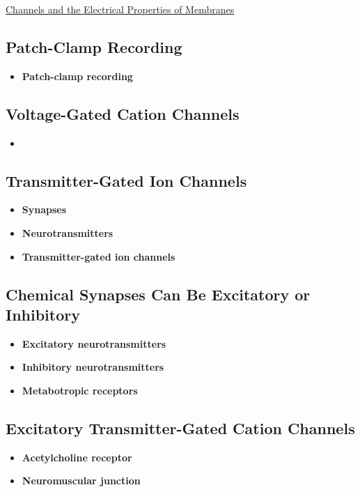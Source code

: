 \documentclass[12pt,letterpaper]{article}
\begin{document}
\begin{secbox}{\hyperlink{11}{Channels and the Electrical Properties of Membranes}}
{    \hypertarget{11.3.10}{\subsection*{Patch-Clamp Recording}}
    \begin{itemize}
        \item \textbf{Patch-clamp recording}
    \end{itemize}

    \hypertarget{11.3.11}{\subsection*{Voltage-Gated Cation Channels}}
    \begin{itemize}
        \item
    \end{itemize}
    
    \hypertarget{11.3.12}{\subsection*{Transmitter-Gated Ion Channels}}
    \begin{itemize}
        \item \textbf{Synapses}
        \item \textbf{Neurotransmitters}
        \item \textbf{Transmitter-gated ion channels}
    \end{itemize}
    
    \hypertarget{11.3.13}{\subsection*{Chemical Synapses Can Be Excitatory or Inhibitory}}
    \begin{itemize}
        \item \textbf{Excitatory neurotransmitters}
        \item \textbf{Inhibitory neurotransmitters}
        \item \textbf{Metabotropic receptors}
    \end{itemize}
    
    \hypertarget{11.3.14}{\subsection*{Excitatory Transmitter-Gated Cation Channels}}
    \begin{itemize}
        \item \textbf{Acetylcholine receptor}
        \item \textbf{Neuromuscular junction}
    \end{itemize}

}
\end{secbox}
\end{document}
